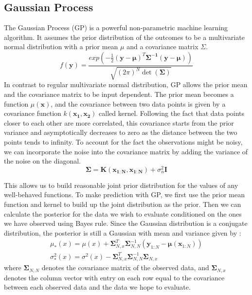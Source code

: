 \subsection{Gaussian Process}
The Gaussian Process (GP) is a powerful non-parametric machine learning algorithm. 
It assumes the prior distribution of the outcomes to be a multivariate normal distribution with a prior mean $\mu$ and a covariance matrix $\Sigma$. 
\begin{equation}
f(\bm{y}) = \frac{exp(
-\frac{1}{2}(\bm{y} - \bm{\mu})^T \bm{\Sigma^{-1}} (\bm{y} - \bm{\mu})
)}
{
\sqrt{(2\pi)^N \det(\bm{\Sigma})}
}
\label{multi_normal}
\end{equation}
In contrast to regular multivariate normal distribution, GP allows the prior mean and the covariance matrix to be input dependent. The
prior mean becomes a function $\mu(\bm{x})$, and the covariance between two data points is given by a covariance function 
$k(\bm{x_1}, \bm{x_2})$ called kernel. 
Following the fact that data points closer to each other are more correlated, this covariance starts from the prior variance and asymptotically decreases to zero as the distance between the two points tends to infinity. 
To account for the fact the observations might be noisy, we can incorporate the noise into the covariance matrix by adding the variance of the noise on the diagonal.
\begin{equation}
\bm{\Sigma} = \bm{K}(\bm{x_{1:N}}, \bm{x_{1:N}}) + \sigma_n^2 \mathbf{I}
\label{covariance_matrix}
\end{equation}

This allows us to build reasonable joint prior distribution for the values of any well-behaved functions.
To make prediction with GP, we first use the prior mean function and kernel to build up the joint distribution as the prior. 
Then we can calculate the posterior for the data we wish to evaluate conditioned on the ones we have observed using Bayes rule.
Since the Gaussian distribution is a conjugate distribution, the posterior is still a Gaussian with mean and variance given by \cite{GP, GP_posterior}:
\begin{equation}
\begin{gathered}
\mu_*(x) = \mu(x) + 
\bm{\Sigma}_{N, x}^T
\bm{\Sigma}_{N, N}^{-1}
(\bm{y}_{1:N} - \bm{\mu}(\bm{x}_{1:N}))
\\
\sigma^2_*(x) = \sigma^2(x) -  
\bm{\Sigma}_{N, x}^T
\bm{\Sigma}_{N, N}^{-1}
\bm{\Sigma}_{N, x}
\end{gathered}
\label{GP_posterior}
\end{equation}
where $\bm{\Sigma}_{N, N}$ denotes the covariance matrix of the observed data, and $\bm{\Sigma}_{N, x}$ denotes the column vector with entry on each row equal to the covariance between 
each observed data and the data we hope to evaluate.

